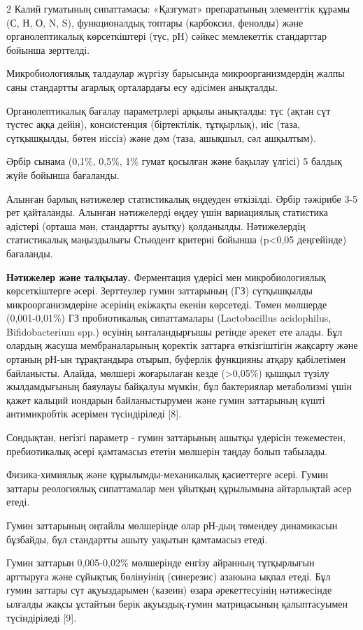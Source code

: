 \begin{multicols}{2}
Калий гуматының сипаттамасы: «Қазгумат» препаратының элементтік құрамы
(С, Н, О, N, S), функционалдық топтары (карбоксил, фенолды) және
органолептикалық көрсеткіштері (түс, рН) сәйкес мемлекеттік стандарттар
бойынша зерттелді.

Микробиологиялық талдаулар жүргізу барысында микроорганизмдердің жалпы
саны стандартты агарлық орталардағы есу әдісімен анықталды.

Органолептикалық бағалау параметрлері арқылы анықталды: түс (ақтан сүт
түстес аққа дейін), консистенция (біртектілік, тұтқырлық), иіс (таза,
сүтқышқылды, бөтен иіссіз) және дәм (таза, ашықшыл, сәл ашқылтым).

Әрбір сынама (0,1\%, 0,5\%, 1\% гумат қосылған және бақылау үлгісі) 5
балдық жүйе бойынша бағаланды.

Алынған барлық нәтижелер статистикалық өңдеуден өткізілді. Әрбір
тәжірибе 3-5 рет қайталанды. Алынған нәтижелерді өңдеу үшін вариациялық
статистика әдістері (орташа мән, стандартты ауытқу) қолданылды.
Нәтижелердің статистикалық маңыздылығы Стьюдент критериі бойынша
(p<0,05 деңгейінде) бағаланды.

{\bfseries Нәтижелер және талқылау.} Ферментация үдерісі мен
микробиологиялық көрсеткіштерге әсері. Зерттеулер гумин заттарының (ГЗ)
сүтқышқылды микроорганизмдеріне әсерінің екіжақты екенін көрсетеді.
Төмен мөлшерде (0,001-0,01\%) ГЗ пробиотикалық сипаттамалары
(Lactobacillus acidophilus, Bifidobacterium spp.) өсуінің ынталандырғышы
ретінде әрекет ете алады. Бұл олардың жасуша мембраналарының қоректік
заттарға өткізгіштігін жақсарту және ортаның рН-ын тұрақтандыра отырып,
буферлік функцияны атқару қабілетімен байланысты. Алайда, мөлшері
жоғарылаған кезде (\textgreater0,05\%) қышқыл түзілу жылдамдығының
баяулауы байқалуы мүмкін, бұл бактериялар метаболизмі үшін қажет кальций
иондарын байланыстырумен және гумин заттарының күшті антимикробтік
әсерімен түсіндіріледі {[}8{]}.

Сондықтан, негізгі параметр - гумин заттарының ашытқы үдерісін
тежеместен, пребиотикалық әсері қамтамасыз ететін мөлшерін таңдау болып
табылады.

Физика-химиялық және құрылымды-механикалық қасиеттерге әсері. Гумин
заттары реологиялық сипаттамалар мен ұйытқың құрылымына айтарлықтай әсер
етеді.

Гумин заттарының оңтайлы мөлшерінде олар рН-дың төмендеу динамикасын
бұзбайды, бұл стандартты ашыту уақытын қамтамасыз етеді.

Гумин заттарын 0,005-0,02\% мөлшерінде енгізу айранның тұтқырлығын
арттыруға және сұйықтық бөлінуінің (синерезис) азаюына ықпал етеді. Бұл
гумин заттары сүт ақуыздарымен (казеин) өзара әрекеттесуінің нәтижесінде
ылғалды жақсы ұстайтын берік ақуыздық-гумин матрицасының қалыптасуымен
түсіндіріледі {[}9{]}.


\end{multicols}
